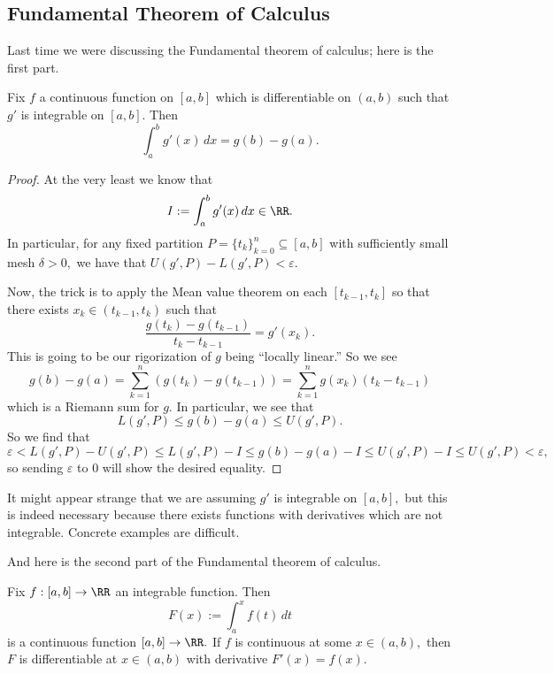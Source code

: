 \documentclass[../notes.tex]{subfiles}
\begin{document}














\subsection{Fundamental Theorem of Calculus}
Last time we were discussing the Fundamental theorem of calculus; here is the first part.
\begin{theorem}
	Fix $f$ a continuous function on $[a,b]$ which is differentiable on $(a,b)$ such that $g'$ is integrable on $[a,b].$ Then
	\[\int_a^bg'(x)\,dx=g(b)-g(a).\]
\end{theorem}
\begin{proof}
	At the very least we know that
	\[I:=\int_a^bg'(x)\,dx\in\RR.\]
	In particular, for any fixed partition $P=\{t_k\}_{k=0}^n\subseteq[a,b]$ with sufficiently small mesh $\delta>0,$ we have that $U(g',P)-L(g',P)<\varepsilon.$
	
	Now, the trick is to apply the Mean value theorem on each $[t_{k-1},t_k]$ so that there exists $x_k\in(t_{k-1},t_k)$ such that
	\[\frac{g(t_k)-g(t_{k-1})}{t_k-t_{k-1}}=g'(x_k).\]
	This is going to be our rigorization of $g$ being ``locally linear.'' So we see
	\[g(b)-g(a)=\sum_{k=1}^n(g(t_k)-g(t_{k-1}))=\sum_{k=1}^ng(x_k)(t_k-t_{k-1})\]
	which is a Riemann sum for $g.$ In particular, we see that
	\[L(g',P)\le g(b)-g(a)\le U(g',P).\]
	So we find that
	\[\varepsilon<L(g',P)-U(g',P)\le L(g',P)-I\le g(b)-g(a)-I\le U(g',P)-I\le U(g',P)<\varepsilon,\]
	so sending $\varepsilon$ to $0$ will show the desired equality.
\end{proof}
\begin{remark}
	It might appear strange that we are assuming $g'$ is integrable on $[a,b],$ but this is indeed necessary because there exists functions with derivatives which are not integrable. Concrete examples are difficult.
\end{remark}
And here is the second part of the Fundamental theorem of calculus.
\begin{theorem}
	Fix $f:[a,b]\to\RR$ an integrable function. Then
	\[F(x):=\int_a^xf(t)\,dt\]
	is a continuous function $[a,b]\to\RR.$ If $f$ is continuous at some $x\in(a,b),$ then $F$ is differentiable at $x\in(a,b)$ with derivative $F'(x)=f(x).$
\end{theorem}
\end{document}
